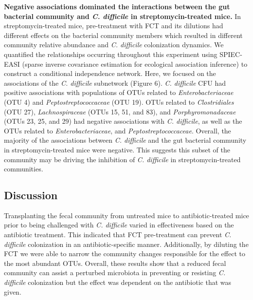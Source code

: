 \documentclass[
  12pt,
]{article}
\begin{document}
\textbf{Negative associations dominated the interactions between the gut
bacterial community and \emph{C. difficile} in streptomycin-treated
mice.} In streptomycin-treated mice, pre-treatment with FCT and its
dilutions had different effects on the bacterial community members which
resulted in different community relative abundance and \emph{C.
difficile} colonization dynamics. We quantified the relationships
occurring throughout this experiment using SPIEC-EASI (sparse inverse
covariance estimation for ecological association inference) to construct
a conditional independence network. Here, we focused on the associations
of the \emph{C. difficile} subnetwork (Figure 6). \emph{C. difficile}
CFU had positive associations with populations of OTUs related to
\emph{Enterobacteriaceae} (OTU 4) and \emph{Peptostreptococcaceae} (OTU
19). OTUs related to \emph{Clostridiales} (OTU 27),
\emph{Lachnospiraceae} (OTUs 15, 51, and 83), and
\emph{Porphyromonadaceae} (OTUs 23, 25, and 29) had negative
associations with \emph{C. difficile}, as well as the OTUs related to
\emph{Enterobacteriaceae}, and \emph{Peptostreptococcaceae}. Overall,
the majority of the associations between \emph{C. difficile} and the gut
bacterial community in streptomycin-treated mice were negative. This
suggests this subset of the community may be driving the inhibition of
\emph{C. difficile} in streptomycin-treated communities.

\hypertarget{discussion}{%
\subsection{Discussion}\label{discussion}}

Transplanting the fecal community from untreated mice to
antibiotic-treated mice prior to being challenged with \emph{C.
difficile} varied in effectiveness based on the antibiotic treatment.
This indicated that FCT pre-treatment can prevent \emph{C. difficile}
colonization in an antibiotic-specific manner. Additionally, by diluting
the FCT we were able to narrow the community changes responsible for the
effect to the most abundant OTUs. Overall, these results show that a
reduced fecal community can assist a perturbed microbiota in preventing
or resisting \emph{C. difficile} colonization but the effect was
dependent on the antibiotic that was given.
\end{document}
